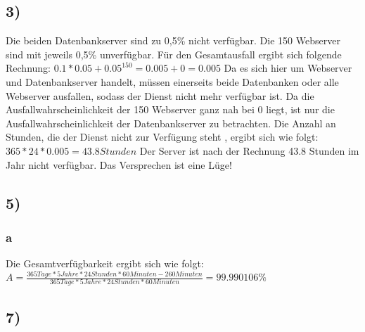 \documentclass[ngerman]{fbi-aufgabenblatt}
\begin{document}
	\setcounter{section}{0}


	\subsection*{3)}
  Die beiden Datenbankserver sind zu 0,5\% nicht verfügbar. Die 150 Webserver
	sind mit jeweils 0,5\% unverfügbar.
	Für den Gesamtausfall ergibt sich folgende Rechnung: \newline
	$0.1* 0.05 + {0.05}^{150} = 0.005 + 0 = 0.005$ \newline
	Da es sich hier um Webserver und Datenbankserver handelt, müssen einerseits
	beide Datenbanken
	oder alle Webserver ausfallen, sodass der Dienst nicht mehr verfügbar ist.
	Da die Ausfallwahrscheinlichkeit der 150 Webserver ganz nah bei 0 liegt, ist
	nur die Ausfallwahrscheinlichkeit der Datenbankserver zu betrachten.
	\newline
	Die Anzahl an Stunden, die der Dienst nicht zur Verfügung steht , ergibt sich wie folgt: \newline
	$365 * 24 * 0.005 = 43.8 Stunden$ \newline
	Der Server ist nach der Rechnung 43.8 Stunden im Jahr nicht verfügbar.
	Das Versprechen ist eine Lüge!
	
	\subsection*{5)}

  \subsubsection*{a}
  Die Gesamtverfügbarkeit ergibt sich wie folgt: \newline
  \newline
  $A = \frac{365 Tage * 5 Jahre * 24 Stunden * 60 Minuten - 260 Minuten}{365 Tage * 5
  Jahre * 24 Stunden * 60 Minuten}= 99.990106 \%$
  

	
	\subsection*{7)}
\end{document}
